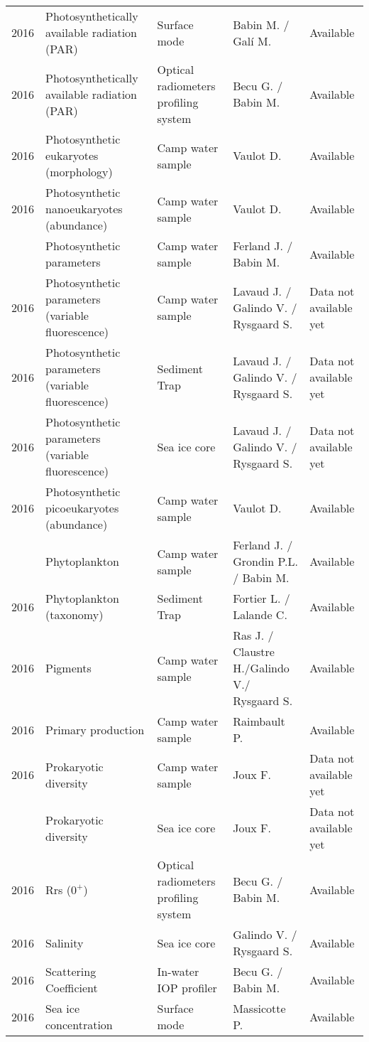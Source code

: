 \documentclass[]{article}
\begin{document}
\begin{landscape}
\begin{longtable}{rllll}
2016 & Photosynthetically available radiation (PAR) & Surface mode & Babin M. / Galí M. & Available\\
2016 & Photosynthetically available radiation (PAR) & Optical radiometers profiling system & Becu G. / Babin M. & Available\\
2016 & Photosynthetic eukaryotes (morphology) & Camp water sample & Vaulot D. & Available\\
2016 & Photosynthetic nanoeukaryotes (abundance) & Camp water sample & Vaulot D. & Available\\
\addlinespace
2016 & Photosynthetic parameters & Camp water sample & Ferland J. / Babin M. & Available\\
2016 & Photosynthetic parameters (variable fluorescence) & Camp water sample & Lavaud J. / Galindo V. / Rysgaard S. & Data not available yet\\
2016 & Photosynthetic parameters (variable fluorescence) & Sediment Trap & Lavaud J. / Galindo V. / Rysgaard S. & Data not available yet\\
2016 & Photosynthetic parameters (variable fluorescence) & Sea ice core & Lavaud J. / Galindo V. / Rysgaard S. & Data not available yet\\
2016 & Photosynthetic picoeukaryotes (abundance) & Camp water sample & Vaulot D. & Available\\
\addlinespace
2016 & Phytoplankton & Camp water sample & Ferland J. / Grondin P.L. / Babin M. & Available\\
2016 & Phytoplankton (taxonomy) & Sediment Trap & Fortier L. / Lalande C. & Available\\
2016 & Pigments & Camp water sample & Ras J. / Claustre H./Galindo V./ Rysgaard S. & Available\\
2016 & Primary production & Camp water sample & Raimbault P. & Available\\
2016 & Prokaryotic diversity & Camp water sample & Joux F. & Data not available yet\\
\addlinespace
2016 & Prokaryotic diversity & Sea ice core & Joux F. & Data not available yet\\
2016 & Rrs ($0^+$) & Optical radiometers profiling system & Becu G. / Babin M. & Available\\
2016 & Salinity & Sea ice core & Galindo V. / Rysgaard S. & Available\\
2016 & Scattering Coefficient & In-water IOP profiler & Becu G. / Babin M. & Available\\
2016 & Sea ice concentration & Surface mode & Massicotte P. & Available\\

\end{longtable}
\end{landscape}
\end{document}
